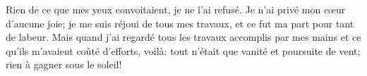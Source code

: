 Rien de ce que mes yeux convoitaient, je ne l’ai refusé.
Je n’ai privé mon cœur d’aucune joie;
	je me suis réjoui de tous mes travaux, et ce fut ma part pour tant de labeur.
Mais quand j’ai regardé tous les travaux accomplis par mes mains
	et ce qu’ils m’avaient coûté d’efforts,
	voilà: tout n’était que vanité et poursuite de vent;
	rien à gagner sous le soleil!
